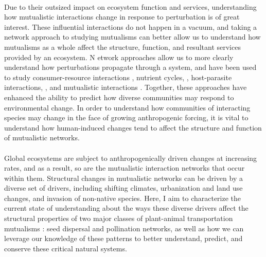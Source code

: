 \paragraph{}
Due to their outsized impact on ecosystem function and services, understanding how mutualistic interactions change in response to perturbation is of great interest. These influential interactions do not happen in a vacuum, and taking a network approach to studying mutualisms can better allow us to understand how mutualisms as a whole affect the structure, function, and resultant services provided by an ecosystem. N	etwork approaches allow us to more clearly understand how perturbations propagate through a system, and have been used to study consumer-resource interactions \parencite{rooney2012integrating}, nutrient cycles, \parencite{christian1996nitrogen}, host-parasite interactions, \parencite{dallas2015co}, and mutualistic interactions \parencite{vanbergen2017network, rohr2014structural}. Together, these approaches have enhanced the ability to predict how diverse communities may respond to environmental change. In order to understand how communities of interacting species may change in the face of growing anthropogenic forcing, it is vital to understand how human-induced changes tend to affect the structure and function of mutualistic networks. 

\paragraph*{}
Global ecosystems are subject to anthropogenically driven changes at increasing rates, and as a result, so are the mutualistic interaction networks that occur within them. Structural changes in mutualistic networks can be driven by a diverse set of drivers, including shifting climates, urbanization and land use changes, and invasion of non-native species. Here, I aim to characterize the current state of understanding about the ways these diverse drivers affect the structural properties of two major classes of plant-animal transportation mutualisms \parencite{bronsteinmutualism1}: seed dispersal and pollination networks, as well as how we can leverage our knowledge of these patterns to better understand, predict, and conserve these critical natural systems. 



